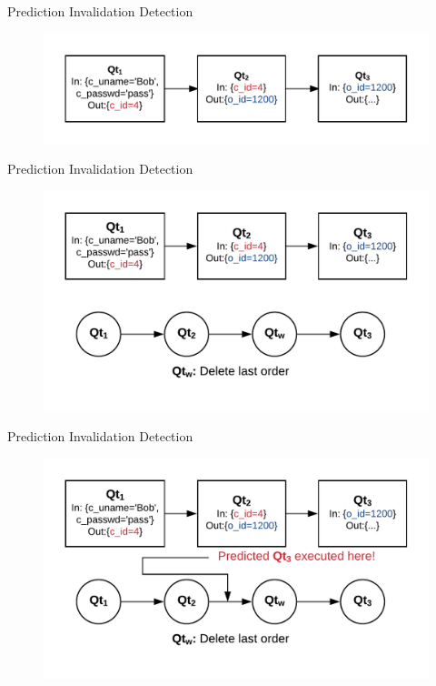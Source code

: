 \documentclass[10pt]{beamer}
\begin{document}
\begin{frame}[fragile]{Prediction Invalidation Detection}
    \begin{figure}
        \includegraphics[scale=0.22]{apollo_query_pipeline}
    \end{figure}
\end{frame}

\begin{frame}[fragile]{Prediction Invalidation Detection}
    \begin{figure}
        \center
        \includegraphics[scale=0.22]{apollo_write_boundary}
    \end{figure}
\end{frame}

\begin{frame}[fragile]{Prediction Invalidation Detection}
    \begin{figure}
        \center
        \includegraphics[scale=0.22]{apollo_write_boundary_2}
    \end{figure}
\end{frame}
\end{document}

